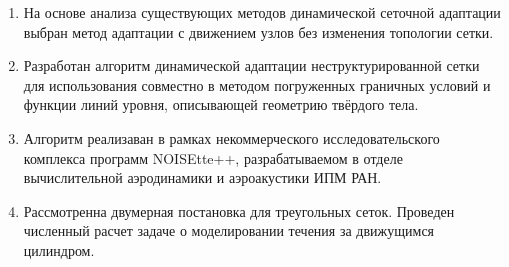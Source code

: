 \begin{enumerate}
	\item На основе анализа существующих методов динамической сеточной адаптации выбран метод адаптации с движением узлов без изменения топологии сетки.
	\item  Разработан алгоритм динамической адаптации неструктурированной сетки для  использования совместно в методом погруженных граничных условий и функции линий уровня, описывающей геометрию твёрдого тела.
	\item Алгоритм реализаван в рамках некоммерческого исследовательского комплекса программ NOISEtte++, разрабатываемом в отделе вычислительной аэродинамики и аэроакустики ИПМ РАН.
	\item Рассмотренна двумерная постановка для треугольных сеток. Проведен численный расчет задаче о моделировании течения за движущимся цилиндром.
\end{enumerate}
